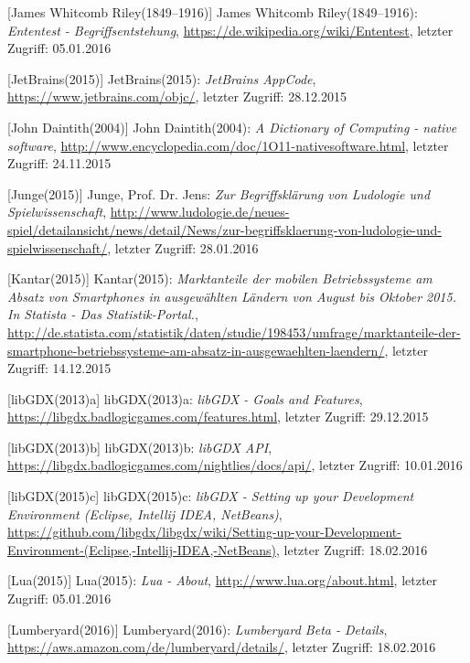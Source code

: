 \begin{thebibliography}{}
[James Whitcomb Riley(1849–1916)] James Whitcomb Riley(1849–1916): \emph{Ententest - Begriffsentstehung},
\url{https://de.wikipedia.org/wiki/Ententest}, letzter Zugriff: 05.01.2016

[JetBrains(2015)] JetBrains(2015): \emph{JetBrains AppCode},
\url{https://www.jetbrains.com/objc/}, letzter Zugriff: 28.12.2015

[John Daintith(2004)] John Daintith(2004): \emph{A Dictionary of Computing - native software},
\url{http://www.encyclopedia.com/doc/1O11-nativesoftware.html}, letzter Zugriff: 24.11.2015

[Junge(2015)] Junge, Prof. Dr. Jens:
\emph{Zur Begriffsklärung von Ludologie und Spielwissenschaft},
\url{http://www.ludologie.de/neues-spiel/detailansicht/news/detail/News/zur-begriffsklaerung-von-ludologie-und-spielwissenschaft/}, letzter Zugriff: 28.01.2016

[Kantar(2015)] Kantar(2015): \emph{Marktanteile der mobilen Betriebssysteme am Absatz von Smartphones in ausgewählten Ländern von August bis Oktober 2015. In Statista - Das Statistik-Portal.},
\url{http://de.statista.com/statistik/daten/studie/198453/umfrage/marktanteile-der-smartphone-betriebssysteme-am-absatz-in-ausgewaehlten-laendern/}, letzter Zugriff: 14.12.2015

[libGDX(2013)a] libGDX(2013)a: \emph{libGDX - Goals and Features},
\url{https://libgdx.badlogicgames.com/features.html}, letzter Zugriff: 29.12.2015

[libGDX(2013)b] libGDX(2013)b: \emph{libGDX API},
\url{https://libgdx.badlogicgames.com/nightlies/docs/api/}, letzter Zugriff: 10.01.2016

[libGDX(2015)c] libGDX(2015)c: \emph{libGDX - Setting up your Development Environment (Eclipse, Intellij IDEA, NetBeans)},
\url{https://github.com/libgdx/libgdx/wiki/Setting-up-your-Development-Environment-(Eclipse,-Intellij-IDEA,-NetBeans)}, letzter Zugriff: 18.02.2016

[Lua(2015)] Lua(2015): \emph{Lua - About},
\url{http://www.lua.org/about.html}, letzter Zugriff: 05.01.2016

[Lumberyard(2016)] Lumberyard(2016): \emph{Lumberyard Beta - Details},
\url{https://aws.amazon.com/de/lumberyard/details/}, letzter Zugriff: 18.02.2016


\end{thebibliography}
